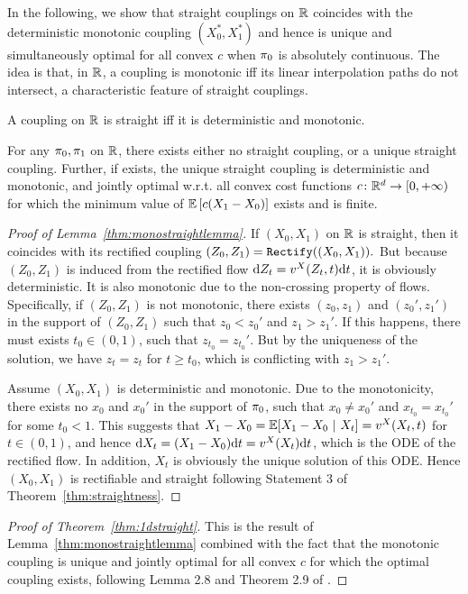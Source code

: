 In the following, we show that straight couplings on $\mathbb{R}$ coincides with the deterministic monotonic coupling $(X_0^*, X_1^*)$ and hence is unique and simultaneously optimal for all convex $c$ when ${\pi}_0$ is absolutely continuous.
The idea is that, in $\mathbb{R}$, a coupling is monotonic 
iff 
its linear interpolation paths do not intersect, a characteristic feature of straight couplings. 
\begin{lem}\label{thm:monostraightlemma}
A coupling on $\mathbb{R}$ is  straight iff it is deterministic and monotonic. 
\end{lem} 
\begin{thm}\label{thm:1dstraight} 
For any ${\pi}_0,{\pi}_1$ on $\mathbb{R}$, 
there exists either no straight coupling,
or a unique straight coupling. 
Further, if exists, the unique straight coupling is  deterministic and monotonic,  and jointly optimal w.r.t. all  convex cost functions $c\colon \mathbb{R}^d\to [0,+\infty)$ 
for which the minimum value of $\mathbb{E}\left[c(X_1-X_0)\right]$ exists and is finite.  
\end{thm} 
\begin{proof}[Proof of Lemma~\ref{thm:monostraightlemma}] 
If $(X_0,X_1)$ on $\mathbb{R}$ is straight, 
then it coincides with its rectified coupling $(Z_0,Z_1) = \mathtt{Rectify}((X_0,X_1)).$ 
But because $(Z_0,Z_1)$ is induced from the rectified flow $\mathrm{d} Z_t = v^X(Z_t, t) \mathrm{d}t $, it is obviously deterministic. It is also monotonic due to the non-crossing property of flows.  Specifically, 
if $(Z_0,Z_1)$ is not monotonic, there exists $(z_0,z_1)$ and $(z_0',z_1')$ in the support of $(Z_0,Z_1)$ such that $z_0<z_0'$ and $z_1 > z_1'$. If this happens, there must exists $t_0\in(0,1)$, such that $z_{t_0} = z_{t_0}'$. But by the uniqueness of the solution, we have $z_t=z_t$ for $t\geq t_0$, which is conflicting with $z_1 > z_1'$. 

Assume $(X_0,X_1)$ is deterministic and monotonic. %
Due to the monotonicity, there exists no $x_0$ and $x_0'$ in the support of ${\pi}_0$, such that $x_0 \neq x_0'$ and $x_{t_0} = x_{t_0}'$ for some $t_0<1$.  This suggests that $X_1-X_0 = \mathbb{E}[X_1-X_0~|~X_t] = v^X(X_t,t)$ for $t\in(0,1)$, and hence  $\mathrm{d}  X_t = (X_1-X_0)\mathrm{d}t = v^X(X_t) \mathrm{d}t $, which is the ODE of the rectified flow. In addition, $X_t$ is obviously the unique solution of this ODE.  Hence $(X_0,X_1)$ is rectifiable and straight following Statement 3 of Theorem~\ref{thm:straightness}.  
\end{proof} 

\begin{proof}[Proof of Theorem~\ref{thm:1dstraight}]
This is the result of Lemma~\ref{thm:monostraightlemma} combined with the fact that the monotonic coupling is unique and jointly optimal for all convex $c$ for which the optimal coupling exists, following 
Lemma 2.8 and 
Theorem 2.9 of \cite{santambrogio2015optimal}. 
\end{proof}

